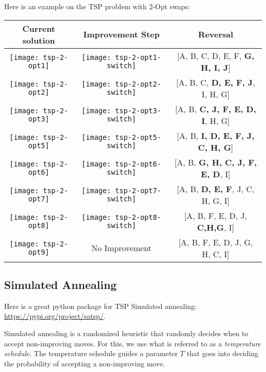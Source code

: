 Here is an example on the TSP problem with 2-Opt swaps:


\begin{longtable}{ccc}
\textbf{Current solution} & \textbf{Improvement Step} & \textbf{Reversal}\\
\hline
\texttt{[image: tsp-2-opt1]} & \texttt{[image: tsp-2-opt1-switch]} & 
[A, B, C, D, E, F, \textbf{G, H, I, J}]
\\
\texttt{[image: tsp-2-opt2]} & \texttt{[image: tsp-2-opt2-switch]} & 
[A, B, C, \textbf{D, E, F, J}, I, H, G]\\
\texttt{[image: tsp-2-opt3]} & \texttt{[image: tsp-2-opt3-switch]} & 
[A, B, \textbf{C, J, F, E, D, I}, H, G]
\\
\texttt{[image: tsp-2-opt5]} & \texttt{[image: tsp-2-opt5-switch]} & 
[A, B, \textbf{I, D, E, F, J, C, H, G}]
\\
\texttt{[image: tsp-2-opt6]} & \texttt{[image: tsp-2-opt6-switch]} & 
[A, B, \textbf{G, H, C, J, F, E, D}, I] 
\\
\texttt{[image: tsp-2-opt7]} & \texttt{[image: tsp-2-opt7-switch]} & 
[A, B, \textbf{D, E, F}, J, C, H, G, I] 
\\
\texttt{[image: tsp-2-opt8]} & \texttt{[image: tsp-2-opt8-switch]} & 
[A, B, F, E, D, J, \textbf{C,H,G}, I]  
\\
\texttt{[image: tsp-2-opt9]} & No Improvement& 
[A, B, F, E, D, J, G, H, C, I] 
\\
\hline
\hline
\end{longtable}



\subsection{Simulated Annealing}

Here is a great python package for TSP Simulated annealing: \url{https://pypi.org/project/satsp/}.

Simulated annealing is a randomized heuristic that randomly decides when to accept non-improving moves.  For this, we use what is referred to as a \emph{temperature schedule}.  The temperature schedule guides a parameter $T$ that goes into deciding the probability of accepting a non-improving move.


